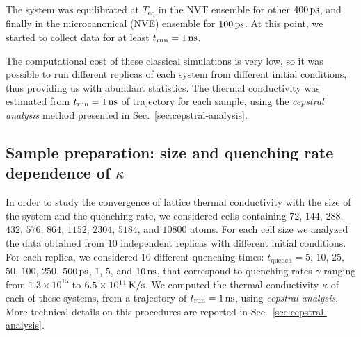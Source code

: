 The system was equilibrated at $T_{\mathrm{eq}}$ in the NVT ensemble for other $400\,\mathrm{ps}$, and finally in the microcanonical (NVE) ensemble for $100\,\mathrm{ps}$. 
At this point, we started to collect data for at least $t_{\mathrm{run}} = 1\,\mathrm{ns}$. 

The computational cost of these classical simulations is very low, so it was possible to run different replicas of each system from different initial conditions, thus providing us with abundant statistics. 
The thermal conductivity was estimated from $t_{\mathrm{run}} = 1\,\mathrm{ns}$ of trajectory for each sample, using the \emph{cepstral analysis} method presented in Sec.~\ref{sec:cepstral-analysis}.



\subsection{Sample preparation: size and quenching rate dependence of $\kappa$}  \label{sec:results-class-quench}
In order to study the convergence of lattice thermal conductivity with the size of the system and the quenching rate, we considered cells containing $72$, $144$, $288$, $432$, $576$, $864$, $1152$, $2304$, $5184$, and $10800$ atoms. For each cell size we analyzed the data obtained from $10$ independent replicas with different initial conditions. 
For each replica, we considered $10$ different quenching times: $t_{\mathrm{quench}} = 5$, $10$, $25$, $50$, $100$, $250$, $500\,\mathrm{ps}$, $1$, $5$, and $10\,\mathrm{ns}$, that correspond to quenching rates $\gamma$ ranging from $1.3\times 10^{15}$ to $6.5\times 10^{11}\,\mathrm{K/s}$.
We computed the thermal conductivity $\kappa$ of each of these systems, from a trajectory of $t_\mathrm{run}=1\,\mathrm{ns}$, using \emph{cepstral analysis}. More technical details on this procedures are reported in Sec.~\ref{sec:cepstral-analysis}. 

